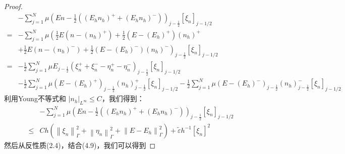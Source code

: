 \begin{proof}
    $$
        \begin{aligned}
              & -\sum_{j=1}^{N} \mu\left(E n-\frac{1}{2}\left(\left(E_{h} n_{h}\right)^{+}+\left(E_{h} n_{h}\right)^{-}\right)\right)_{j-\frac{1}{2}}\left[\xi_{n}\right]_{j-1 / 2}                                                                                                                                              \\
            = & -\sum_{j=1}^{N} \mu\left(\frac{1}{2} E\left(n-\left(n_{h}\right)^{+}\right)+\frac{1}{2}\left(E-\left(E_{h}\right)^{+}\right)\left(n_{h}\right)^{+}\right.                                                                                                                                                        \\
              & \left.+\frac{1}{2} E\left(n-\left(n_{h}\right)^{-}\right)+\frac{1}{2}\left(E-\left(E_{h}\right)^{-}\right)\left(n_{h}\right)^{-}\right)_{j-\frac{1}{2}}\left[\xi_{n}\right]_{j-1 / 2}                                                                                                                            \\
            = & -\frac{1}{2} \sum_{j=1}^{N} \mu E_{j-\frac{1}{2}}\left(\xi_{n}^{+}+\xi_{n}^{-}-\eta_{n}^{+}-\eta_{n}^{-}\right)_{j-\frac{1}{2}}\left[\xi_{n}\right]_{j-1 / 2}                                                                                                                                                    \\
              & -\frac{1}{2} \sum_{j=1}^{N} \mu\left(E-\left(E_{h}\right)^{+}\right)_{j-\frac{1}{2}}\left(n_{h}\right)_{j-\frac{1}{2}}^{+}\left[\xi_{n}\right]_{j-1 / 2}-\frac{1}{2} \sum_{j=1}^{N} \mu\left(E-\left(E_{h}\right)^{-}\right)_{j-\frac{1}{2}}\left(n_{h}\right)_{j-\frac{1}{2}}^{-}\left[\xi_{n}\right]_{j-1 / 2}
        \end{aligned}
    $$
    利用Young不等式和 $\left|n_{h}\right|_{L^{\infty}} \leq C$，我们得到： $$
        \begin{aligned}
                 & -\sum_{j=1}^{N} \mu\left(E n-\frac{1}{2}\left(\left(E_{h} n_{h}\right)^{+}+\left(E_{h} n_{h}\right)^{-}\right)\right)_{j-\frac{1}{2}}\left[\xi_{n}\right]_{j-1 / 2}             \\
            \leq & C h\left(\left\|\xi_{n}\right\|_{\Gamma}^{2}+\left\|\eta_{n}\right\|_{\Gamma}^{2}+\left\|E-E_{h}\right\|_{\Gamma}^{2}\right)+\tilde{\varepsilon} h^{-1}\left[\xi_{n}\right]^{2}
        \end{aligned}
    $$
    然后从反性质(2.4)，结合(4.9)，我们可以得到

\end{proof}
